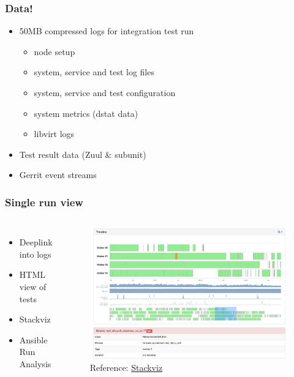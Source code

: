\documentclass[aspectratio=169,11pt,hyperref={colorlinks=true}]{beamer}
\begin{document}
\begin{frame}
    \frametitle{Data!}
    \begin{itemize}
        \item{50MB compressed logs for integration test run}
        \begin{itemize}
            \item{node setup}
            \item{system, service and test log files}
            \item{system, service and test configuration}
            \item{system metrics (dstat data)}
            \item{libvirt logs}
        \end{itemize}
        \item{Test result data (Zuul \& subunit)}
        \item{Gerrit event streams}
    \end{itemize}
\end{frame}


\begin{frame}
    \frametitle{Single run view}
    \begin{columns}
        \begin{itemize}
            \item{Deeplink into logs}
            \item{HTML view of tests}
            \item{Stackviz}
            \item{Ansible Run Analysis}
        \end{itemize}
            \begin{figure}
                \includegraphics[width=1\textwidth]{stackviz.png}
                \caption{Reference: \href{http://logs.openstack.org/22/466822/1/gate/gate-tempest-dsvm-neutron-full-ubuntu-xenial/d6f19c0/logs/stackviz/\#/stdin/timeline?test=tempest.api.network.test_dhcp_ipv6.NetworksTestDHCPv6.test_dhcpv6_stateless_no_ra}{Stackviz}}
            \end{figure}
    \end{columns}
\end{frame}
\end{document}

